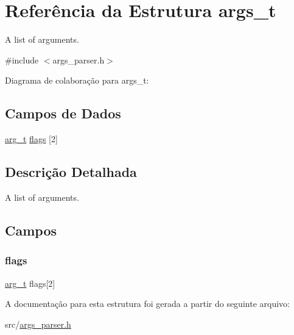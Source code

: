 \hypertarget{structargs__t}{}\section{Referência da Estrutura args\+\_\+t}
\label{structargs__t}


A list of arguments.  




{\ttfamily \#include $<$args\+\_\+parser.\+h$>$}



Diagrama de colaboração para args\+\_\+t\+:
\subsection*{Campos de Dados}
\begin{DoxyCompactItemize}
\item 
\hyperlink{structarg__t}{arg\+\_\+t} \hyperlink{structargs__t_a5491b703fb732e7ff6b854e396b1e460}{flags} \mbox{[}2\mbox{]}
\end{DoxyCompactItemize}


\subsection{Descrição Detalhada}
A list of arguments. 

\subsection{Campos}
\mbox{\label{structargs__t_a5491b703fb732e7ff6b854e396b1e460}} 
\subsubsection{\texorpdfstring{flags}{flags}}
{\footnotesize\ttfamily \hyperlink{structarg__t}{arg\+\_\+t} flags\mbox{[}2\mbox{]}}



A documentação para esta estrutura foi gerada a partir do seguinte arquivo\+:\begin{DoxyCompactItemize}
\item 
src/\hyperlink{args__parser_8h}{args\+\_\+parser.\+h}\end{DoxyCompactItemize}
